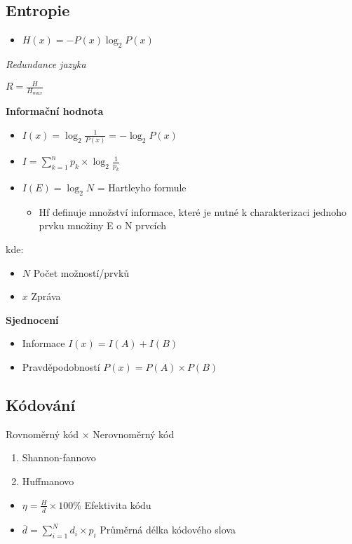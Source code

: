\documentclass{article}
\begin{document}
\subsection{Entropie}
\begin{itemize}
    \item $H\left(x\right)=-P\left(x\right)\log_2P\left(x\right)$
\end{itemize}

\textit{Redundance jazyka}

$R=\frac{H}{H_{max}}$

\textbf{Informační hodnota}
\begin{itemize}
    \item $I\left(x\right)=\log_2\frac{1}{P(x)}=-\log_2P\left(x\right)$
    \item $I=\sum_{k=1}^{n}p_k\times \log_2 \frac{1}{p_k}$
    \item $I\left(E\right)=\log_2N$ = Hartleyho formule
    \begin{itemize}
        \item Hf definuje množství informace, které je nutné k charakterizaci jednoho prvku množiny E o N prvcích
    \end{itemize}
\end{itemize}
kde:
\begin{itemize}
    \item $N$ Počet možností/prvků
    \item $x$ Zpráva
\end{itemize}
\textbf{Sjednocení}
\begin{itemize}
    \item Informace $I(x)=I(A)+I(B)$
    \item Pravděpodobností $P(x)=P(A)\times P(B)$
\end{itemize}
\subsection{Kódování}
Rovnoměrný kód $\times$ Nerovnoměrný kód
\begin{enumerate}
    \item Shannon-fannovo
    \item Huffmanovo
\end{enumerate}

\begin{itemize}
    \item $\eta=\frac{H}{\overline{d}}\times 100\%$ Efektivita kódu
    \item $\overline{d}=\sum_{i=1}^{N}d_i\times p_i$ Průměrná délka kódového slova
\end{itemize}
\end{document}
